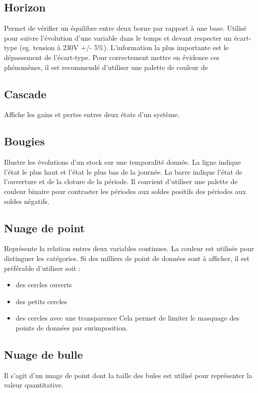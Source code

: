 \documentclass[a4paper,12pt]{article}
\begin{document}
\begin{multicols}{2}
\subsection*{Horizon}
\label{sec:org00e594a}
Permet de vérifier un équilibre entre deux borne par rapport à une base. Utilisé pour suivre l'évolution d'une variable dans le temps et devant respecter un écart-type (eg. tension à 230V +/- 5\%). L'information la plus importante est le dépassement de l'écart-type. Pour correctement mettre en évidence ces phénomènes, il est recommendé d'utiliser une palette de couleur de
\subsection*{Cascade}
\label{sec:orgccba60a}
Affiche les gains et pertes entres deux états d'un système. \autocite{jonathanschwabish4ComparingCategories2021}
\subsection*{Bougies}
\label{sec:org18231d4}
Illustre les évolutions d'un stock sur une temporalité donnée. La ligne indique l'état le plus haut et l'état le plus bas de la journée. La barre indique l'état de l'ouverture et de la cloture de la période.\autocite{jonathanschwabish6Distribution2021} Il convient d'utiliser une palette de couleur binaire pour contraster les périodes aux soldes positifs des périodes aux soldes négatifs.
\subsection*{Nuage de point}
\label{sec:org9b9b7a1}
Représente la relation entres deux variables continues.
La couleur est utilisée pour distinguer les catégories.
Si des milliers de point de données sont à afficher, il est préférable d'utiliser soit :
\begin{itemize}
\item des cercles ouverts
\item des petits cercles
\item des cercles avec une transparence
Cela permet de limiter le masquage des points de données par surimposition.\autocite{andreaskrauseBestPracticesData2024}
\end{itemize}
\subsection*{Nuage de bulle}
\label{sec:org6dd344e}
Il s'agit d'un nuage de point dont la taille des bules est utilisé pour représenter la valeur quantitative.

\end{multicols}
\end{document}
